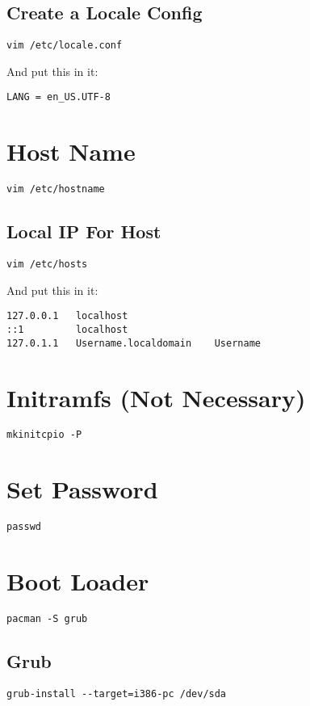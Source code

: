 \documentclass[12pt]{article}
\begin{document}
\subsection{Create a Locale Config}
\begin{verbatim}
vim /etc/locale.conf
\end{verbatim}
And put this in it:
\begin{verbatim}
LANG = en_US.UTF-8
\end{verbatim}

\section{Host Name}
\begin{verbatim}
vim /etc/hostname
\end{verbatim}

\subsection{Local IP For Host}
\begin{verbatim}
vim /etc/hosts
\end{verbatim}
And put this in it:

\begin{verbatim}
127.0.0.1	localhost
::1			localhost
127.0.1.1	Username.localdomain	Username
\end{verbatim}

\section{Initramfs (Not Necessary)}
\begin{verbatim}
mkinitcpio -P
\end{verbatim}

\section{Set Password}
\begin{verbatim}
passwd
\end{verbatim}

\section{Boot Loader}
\begin{verbatim}
pacman -S grub
\end{verbatim}

\subsection{Grub}
\begin{verbatim}
grub-install --target=i386-pc /dev/sda
\end{verbatim}
\end{document}
